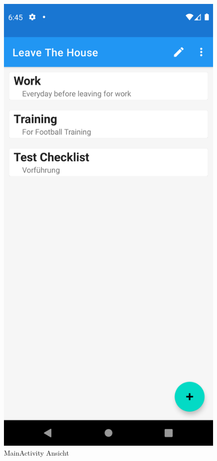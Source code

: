 \begin{figure}[h]
	\centering
	\begin{minipage}{0.45\linewidth}
		\centering
		\includegraphics[width=.9\linewidth]{Bilder/MainActivity.png}
		\caption{MainActivity Ansicht}
		\label{fig:mainActivity}
	\end{minipage}
	\hfill
	\begin{minipage}{0.45\linewidth}

\end{minipage}
\end{figure}

